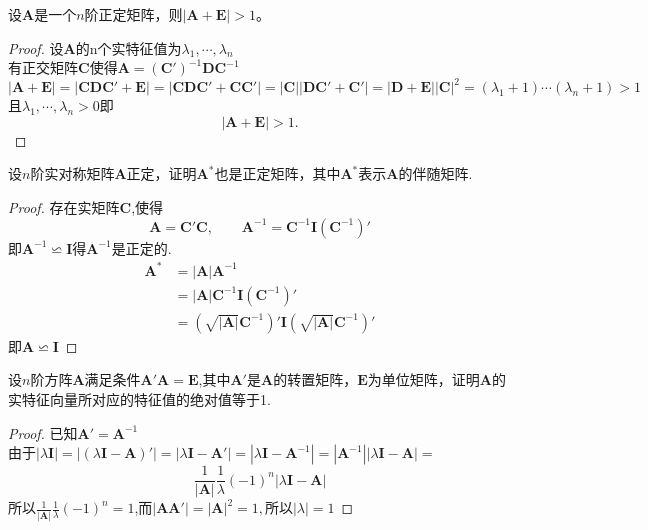 \documentclass[lang=cn,11pt,normal]{elegantbook}
\renewcommand{\AA}{\boldsymbol{A}}
\newcommand{\CC}{\boldsymbol{C}}
\newcommand{\DD}{\boldsymbol{D}}
\newcommand{\II}{\boldsymbol{I}}
\begin{document}
	\begin{exercise}
		设$\AA$是一个$n$阶正定矩阵，则$|\AA+\boldsymbol{E}|>1$。
	\end{exercise}
	\begin{proof}
		设$\AA$的n个实特征值为$\lambda_1,\cdots,\lambda_n$
		\\有正交矩阵$\CC$使得$\AA=(\CC')^{-1}\DD\CC^{-1}$
		\begin{equation}
		|\AA+\boldsymbol{E}|=|\boldsymbol{CDC}'+\boldsymbol{E}|=|\boldsymbol{CDC}'+\boldsymbol{CC}'|=|\CC||\boldsymbol{DC}'+\CC'|=|\DD+\boldsymbol{E}||\CC|^2=(\lambda_1+1)\cdots(\lambda_n+1)>1
		\end{equation}
		且$\lambda_1,\cdots,\lambda_n>0$即
		\begin{equation}
		|\AA+\boldsymbol{E}|>1.
		\end{equation}
	\end{proof}
	\begin{exercise}
		设$n$阶实对称矩阵$\AA$正定，证明$\AA^*$也是正定矩阵，其中$\AA^*$表示$\AA$的伴随矩阵.
	\end{exercise}
	\begin{proof}
		存在实矩阵$\CC$,使得
		\begin{equation}\AA=\CC'\CC,\qquad\AA^{-1}=\CC^{-1}\II(\CC^{-1})'
		\end{equation}
		即$\AA^{-1}\backsimeq\II$得$\AA^{-1}$是正定的.\\
		\begin{equation}
		\begin{aligned}
		\AA^*&=|\AA|\AA^{-1}\\
		&=|\AA|\CC^{-1}\II(\CC^{-1})'\\
		&=(\sqrt{|\AA|}\CC^{-1})'\II(\sqrt{|\AA|}\CC^{-1})'
		\end{aligned}
		\end{equation}
		即$\AA\backsimeq\II$
	\end{proof}
	\begin{exercise}
		设$n$阶方阵$\AA$满足条件$\AA'\AA=\boldsymbol{E}$,其中$\AA'$是$\AA$的转置矩阵，$\boldsymbol{E}$为单位矩阵，证明$\AA$的实特征向量所对应的特征值的绝对值等于1.
	\end{exercise}
	\begin{proof}
		已知$\AA'=\AA^{-1}$\\
		由于$|\lambda\II|=|(\lambda\II-\AA)'|=|\lambda\II-\AA'|=|\lambda\II-\AA^{-1}|=|\AA^{-1}||\lambda\II-\AA|=$
		\begin{equation}
		\frac{1}{|\AA|}\frac{1}{\lambda}(-1)^n|\lambda\II-\AA|
		\end{equation}
		所以$\frac{1}{|\AA|}\frac{1}{\lambda}(-1)^n=1$,而$|\boldsymbol{AA}'|=|\AA|^2=1,$所以$|\lambda|=1$
	\end{proof}
\end{document}
